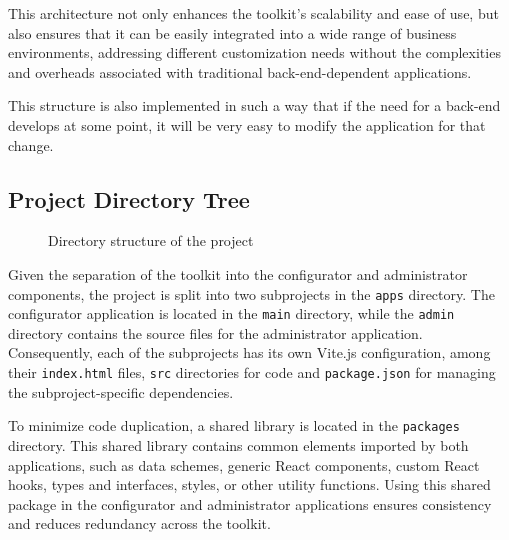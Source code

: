 This architecture not only enhances the toolkit's scalability and ease of use, but also ensures that it can be easily integrated into a wide range of business environments, addressing different customization needs without the complexities and overheads associated with traditional back-end-dependent applications.

This structure is also implemented in such a way that if the need for a back-end develops at some point, it will be very easy to modify the application for that change.

\subsection{Project Directory Tree}

\begin{figure}[h]
    \centering
    \begin{minipage}{0.4\textwidth}
    \end{minipage}
    \caption{Directory structure of the project}
    \label{fig:directory-tree}
\end{figure}

Given the separation of the toolkit into the configurator and administrator components, the project is split into two subprojects in the \texttt{apps} directory. The configurator application is located in the \texttt{main} directory, while the \texttt{admin} directory contains the source files for the administrator application. Consequently, each of the subprojects has its own Vite.js configuration, among their \texttt{index.html} files, \texttt{src} directories for code and \texttt{package.json} for managing the subproject-specific dependencies. 

To minimize code duplication, a shared library is located in the \texttt{packages} directory. This shared library contains common elements imported by both applications, such as data schemes, generic React components, custom React hooks, types and interfaces,  styles, or other utility functions. Using this shared package in the configurator and administrator applications ensures consistency and reduces redundancy across the toolkit.


